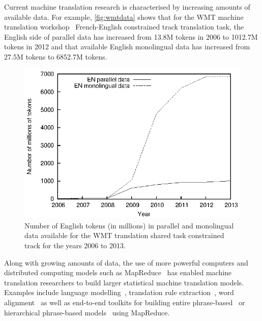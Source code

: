 Current machine translation research is characterised by increasing amounts
of available data. For example, \autoref{fig:wmtdata} shows that
for the WMT machine translation
workshop~\citep{bojar-buck-callisonburch-federmann-haddow-koehn-monz-post-soricut-specia:2013:WMT}
French-English constrained track translation task, the English side of parallel
data has increased from 13.8M tokens in 2006 to 1012.7M tokens in 2012 and that
available English monolingual data has increased from 27.5M tokens to 6852.7M
tokens.
%
\begin{figure}
  \begin{center}
    \includegraphics[scale=0.8]{figures/wmt/wmtdata.eps}
    \caption{Number of English tokens (in millions) in parallel and monolingual
      data available for the WMT translation shared task constrained track for
      the years 2006 to 2013.}
    \label{fig:wmtdata}
  \end{center}
\end{figure}
%
Along with growing amounts of data, the use of more powerful computers
and distributed computing models such as
MapReduce~\citep{dean-ghemawat:2008:ACM,lin-dyer:2010:book} has enabled machine
translation researchers to build larger statistical machine translation models.
Examples include language
modelling~\citep{brants-popat-xu-och-dean:2007:EMNLP-CoNLL}, translation rule
extraction~\citep{dyer-cordova-mont-lin:2008:WMT,weese-ganitkevitch-callisonburch-post-lopez:2011:WMT},
word alignment~\citep{dyer-cordova-mont-lin:2008:WMT,lin-dyer:2010:book} as well
as end-to-end toolkits for building entire
phrase-based~\citep{gao-vogel:2010:PBML} or hierarchical phrase-based
models~\citep{venugopal-zollmann:2009:PBML} using MapReduce.

